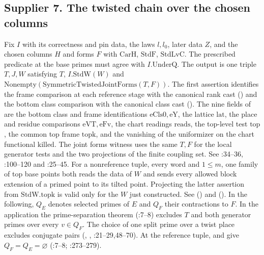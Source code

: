 \subsection{Supplier 7. The twisted chain over the chosen columns}
\label{r12:s7}
Fix $I$ with its correctness and pin data, the laws $l,l_0$, later data
$Z$, and the chosen columns $H$ and forms $F$ with
$\mathrm{CarH}$, $\mathrm{StdF}$, $\mathrm{StdLvC}$. The prescribed
predicate at the base primes must agree with $I.\mathrm{UnderQ}$.
The output is one triple $T,J,W$ satisfying  $T$,
$I.\mathrm{StdW}(W)$ and $\mathrm{Nonempty}(\mathrm{SymmetricTwistedJointForms}(T,F))$.
The first assertion identifies the frame comparison at each reference
stage with the canonical rank cast () and the bottom class
comparison with the canonical class cast (). The nine fields of
 are the bottom class and frame identifications
$\mathrm{eCls0},\mathrm{eY}$, the lattice $\mathrm{lat}$,
the place and residue comparisons $\mathrm{eVT},\mathrm{eFv}$,
the chart readings $\mathrm{reads}$, the top-level test $\mathrm{top}$,
the common top frame $\mathrm{topk}$, and the vanishing of the
uniformizer on the chart functional $\mathrm{killed}$.
The joint forms witness uses the same $T,F$ for the local generator
tests and the two projections of the finite coupling set. See
:34--36, :100--120 and
:25--45. For a nonreference tuple, every
word and $1\le m$,
one family of top base points both reads the data of $W$ and sends every
allowed block extension of a primed point to its tilted point. Projecting
the latter assertion from $\mathrm{StdW}.\mathrm{topk}$ is valid only for
the $W$ just constructed. See 
() and
().
In the following, $Q_E$ denotes selected primes of $E$ and $Q_F$ their
contractions to $F$. In the application the prime-separation theorem
(:7--8)
excludes $T$ and both generator primes over every $v\in Q_F$.
The choice of one split prime over a twist place excludes conjugate
pairs (, ,
:21--29,48--70). At the reference tuple,
 and
 give $Q_F=Q_E=\varnothing$
(:7--8;
:273--279).

